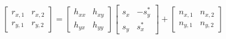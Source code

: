 \documentclass[fleqn]{article}
\begin{document}
\begin{enumerate}
%		
%		
%		
%		
%		
%		
%		
%		
%		
%		
		
		\begin{equation*}
			\begin{bmatrix}
				r_{x,1} & r_{x,2} \\
				r_{y,1} & r_{y,2}
			\end{bmatrix} = \begin{bmatrix}
				h_{xx} & h_{xy} \\
				h_{yx} & h_{yy}
			\end{bmatrix}\begin{bmatrix}
				s_x & -s_y^* \\
				s_y & s_x^*
			\end{bmatrix} + \begin{bmatrix}
				n_{x,1} & n_{x,2} \\
				n_{y,1} & n_{y,2}
			\end{bmatrix}
		\end{equation*}
			

\end{enumerate}
\end{document}
